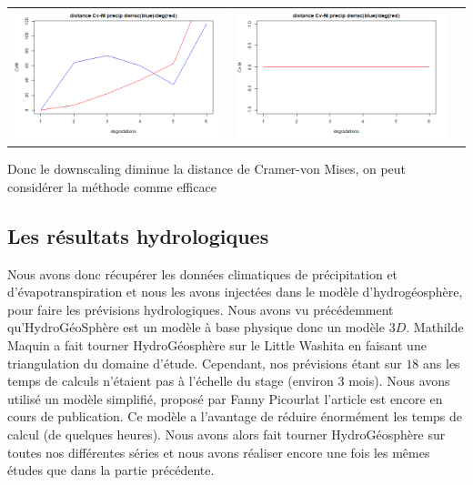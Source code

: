 \documentclass[a4paper,11pt]{article}
\begin{document}
\vspace{0.5 cm}

\hspace{-1cm}
\begin{tabular}{ccc}
	\includegraphics[scale=0.4]{images/Dist_CVM_precip.png} & \includegraphics[scale=0.4]{images/Dist_CVM_evap.png}  \\
\end{tabular} 

Donc le downscaling diminue la distance de Cramer-von Mises, on peut considérer la méthode comme efficace



\subsection{Les résultats hydrologiques}

Nous avons donc récupérer les données climatiques de précipitation et d'évapotranspiration et nous les avons injectées dans le modèle d'hydrogéosphère, pour faire les prévisions hydrologiques. Nous avons vu précédemment qu'HydroGéoSphère est un modèle à base physique donc un modèle $3D$. Mathilde Maquin a fait tourner HydroGéosphère sur le Little Washita en faisant une triangulation du domaine d'étude. Cependant, nos prévisions étant sur $18$ ans les temps de calculs n'étaient pas à l'échelle du stage (environ 3 mois). Nous avons utilisé un modèle simplifié, proposé par Fanny Picourlat l'article est encore en cours de publication. Ce modèle a l'avantage de réduire énormément les temps de calcul (de quelques heures). Nous avons alors fait tourner HydroGéosphère sur toutes nos différentes séries et nous avons réaliser encore une fois les mêmes études que dans la partie précédente.
\end{document}
